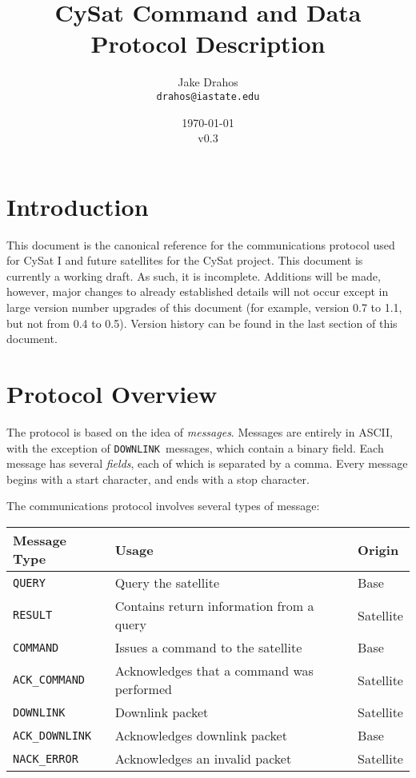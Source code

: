 \documentclass{article}
\begin{document}
\title{CySat Command and Data Protocol Description}
\author{Jake Drahos \\ \texttt{drahos@iastate.edu}}
\date{\today\\v0.3}


\newcommand{\mquery}{\texttt{QUERY }}
\newcommand{\mresult}{\texttt{RESULT }}
\newcommand{\mcommand}{\texttt{COMMAND }}
\newcommand{\mdownlink}{\texttt{DOWNLINK }}
\newcommand{\macommand}{\texttt{ACK\_COMMAND }}
\newcommand{\madownlink}{\texttt{ACK\_DOWNLINK }}
\newcommand{\merror}{\texttt{NACK\_ERROR }}


\maketitle

\section{Introduction}
This document is the canonical reference for the communications protocol used for CySat I and
future satellites for the CySat project.
This document is currently a working draft. As such, it is incomplete. Additions will be made, however, major
changes to already established details will not occur except in large version number upgrades of this document (for example,
version 0.7 to 1.1, but not from 0.4 to 0.5).
Version history can be found in the last section of this document.

\section{Protocol Overview}
The protocol is based on the idea of \emph{messages}.
Messages are entirely in ASCII, with the exception of \mdownlink messages, which
contain a binary field.
Each message has several \emph{fields}, each of which is separated by a comma.
Every message begins with a start character, and ends with a stop character.

The communications protocol involves several types of message:
\begin{center}
  \begin{tabular}{| l | l | l |}
    \hline
    Message Type & Usage & Origin \\ \hline
    \mquery & Query the satellite & Base \\
    \mresult & Contains return information from a query & Satellite \\ \hline
    \mcommand & Issues a command to the satellite & Base \\
    \macommand & Acknowledges that a command was performed & Satellite \\ \hline
    \mdownlink & Downlink packet & Satellite \\
    \madownlink & Acknowledges downlink packet & Base \\ \hline
    \merror & Acknowledges an invalid packet & Satellite \\
    \hline
  \end{tabular}
\end{center}
  
\end{document}
